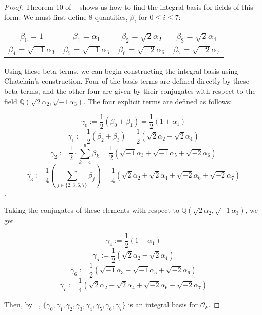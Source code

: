 \documentclass{amsart}
\begin{document}
\begin{proof}
Theorem 10 of ~\cite{Chat} shows us how to find the integral basis for fields of this form. We must first define 8 quantities, $\beta_i$ for $0\leq i \leq 7$:

\begin{center}

\begin{tabular}{cccc}

$\beta_0 = 1$ &  $\beta_1 = \alpha_1$ & $\beta_2 = \sqrt{2}\alpha_2$ &  $\beta_3 = \sqrt{2}\alpha_4$ \\
$\beta_4 = \sqrt{-1}\alpha_3$ & $\beta_5 = \sqrt{-1}\alpha_5$ & $\beta_6  = \sqrt{-2}\alpha_6$ & $\beta_7 = \sqrt{-2}\alpha_7$
\end{tabular}

\end{center}




Using these beta terms, we can begin constructing the integral basis using Chatelain's construction. Four of the basis terms are defined directly by these beta terms, and the other four are given  by their conjugates with respect to the field $\mathbb{Q}\left(\sqrt{2}\alpha_2,\sqrt{-1}\alpha_3\right)$. The four explicit terms are defined as follows:

$$ \gamma_0 :=  \frac12(\beta_0 + \beta_1) = \frac12(1+\alpha_1)$$
$$ \gamma_1 :=  \frac12 (\beta_2 + \beta_3) = \frac12\left(\sqrt{2}\alpha_2 + \sqrt{2}\alpha_4\right)$$
$$ \gamma_2 := \frac12\cdot\sum_{k=4}^{6} \beta_k= \frac12\left(\sqrt{-1}\alpha_3 + \sqrt{-1}\alpha_5+ \sqrt{-2}\alpha_6\right)$$
$$ \gamma_3 := \frac14\left(\sum_{j\in\{2,3,6,7\}} \beta_j \right) = \frac14\left(\sqrt{2}\alpha_2 +\sqrt{2}\alpha_4 +\sqrt{-2}\alpha_6 + \sqrt{-2}\alpha_7\right)$$.


Taking the conjugates of these elements with respect to $\mathbb{Q}\left(\sqrt{2}\alpha_2, \sqrt{-1}\alpha_3\right)$, we get 


$$ \gamma_4 :=  \frac12(1-\alpha_1)$$
$$ \gamma_5 :=  \frac12\left(\sqrt{2}\alpha_2 - \sqrt{2}\alpha_4\right)$$
$$ \gamma_6 :=  \frac12\left(\sqrt{-1}\alpha_3 - \sqrt{-1}\alpha_5 + \sqrt{-2}\alpha_6\right)$$
$$ \gamma_7 :=  \frac14\left(\sqrt{2}\alpha_2 - \sqrt{2}\alpha_4 + \sqrt{-2}\alpha_6 - \sqrt{-2}\alpha_7\right)$$


Then, by ~\cite{Chat}, $\{\gamma_0, \gamma_1,\gamma_2,\gamma_3,\gamma_4,\gamma_5,\gamma_6,\gamma_7\}$ is an integral basis for $\mathcal{O}_k.$



\end{proof}
\end{document}
